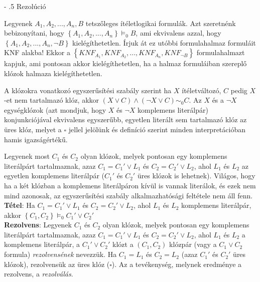 \documentclass[margin=0px]{article}
\makeatletter
\renewcommand\paragraph{%
	\@startsection{paragraph}{4}{0mm}%
	{-\baselineskip}%
	{.5\baselineskip}%
	{\normalfont\normalsize\bfseries}}
\makeatother
\begin{document}
	\paragraph{Rezolúció}
	
	Legyenek $A_{1}, A_{2}, ... , A_{n}, B$ tetszőleges ítéletlogikai formulák.
	Azt szeretnénk bebizonyítani, hogy $\left\{A_{1}, A_{2}, ... , A_{n}\right\} \models_{0} B$,
	ami ekvivalens azzal, hogy $\left\{A_{1}, A_{2}, ... , A_{n}, \neg B\right\}$ kielégíthetetlen.
	Írjuk át ez utóbbi formulahalmaz formuláit KNF alakba! Ekkor a
	$\left\{KNF_{A_{1}}, KNF_{A_{2}}, ... , KNF_{A_{n}}, KNF_{\neg B}\right\}$ formulahalmazt
	kapjuk, ami pontosan akkor kielégíthetetlen, ha a halmaz formuláiban szereplő klózok halmaza
	kielégíthetetlen.
	
	A klózokra vonatkozó egyszerűsítési szabály szerint ha $X$ ítéletváltozó, $C$ pedig $X$-et nem
	tartalmazó klóz, akkor $(X \vee C) \wedge (\neg X \vee C) \sim_{0} C$. Az $X$ és a $\neg X$
	egységklózok (azt mondjuk, hogy $X$ és $\neg X$ komplemens literálpár) konjunkciójával ekvivalens
	egyszerűbb, egyetlen literált sem tartalmazó klóz az üres klóz, melyet a $\square$ jellel
	jelölünk és definíció szerint minden interpretációban hamis igazságértékű.
	
	Legyenek most $C_{1}$ és $C_{2}$ olyan klózok, melyek pontosan egy komplemens literálpárt tartalmaznak,
	azaz $C_{1} = C_{1}' \vee L_{1}$ és $C_{2} = C_{2}' \vee L_{2}$, ahol $L_{1}$ és $L_{2}$ az egyetlen
	komplemens literálpár ($C_{1}'$ és $C_{2}'$ üres klózok is lehetnek). Világos, hogy ha a két klózban
	a komplemens literálpáron kívül is vannak literálok, és ezek nem mind azonosak, az egyszerűsítési
	szabály alkalmazhatósági feltétele nem áll fenn.\\
	
	\noindent \textbf{Tétel}: Ha $C_{1} = C_{1}' \vee L_{1}$ és $C_{2} = C_{2}' \vee L_{2}$,
	ahol $L_{1}$ és $L_{2}$	komplemens literálpár, akkor $\left\{C_{1},C_{2}\right\} \models_{0} C_{1}' \vee C_{2}'$\\
	
	\noindent \textbf{Rezolvens}: Legyenek $C_{1}$ és $C_{2}$ olyan klózok, melyek pontosan egy komplemens literálpárt tartalmaznak,
	azaz $C_{1} = C_{1}' \vee L_{1}$ és $C_{2} = C_{2}' \vee L_{2}$, ahol $L_{1}$ és $L_{2}$ a komplemens literálpár,
	a $C_{1}' \vee C_{2}'$ klózt a $(C_{1},C_{2})$ klózpár (vagy a $C_{1} \vee C_{2}$ formula) \textit{rezolvensének} nevezzük.
	Ha $C_{1} = L_{1}$ és $C_{2} = L_{2}$ (azaz $C_{1}'$ és $C_{2}'$ üres klózok), rezolvensük az üres klóz ($\square$).
	Az a tevékenység, melynek eredménye a rezolvens, a \textit{rezolválás}.
	
\end{document}
